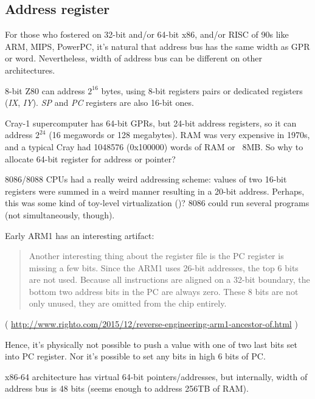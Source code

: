 \subsection{Address register}

For those who fostered on 32-bit and/or 64-bit x86, and/or RISC of 90s like ARM, MIPS, PowerPC, it's natural that
address bus has the same width as \ac{GPR} or \gls{word}.
Nevertheless, width of address bus can be different on other architectures.

8-bit Z80 can address $2^{16}$ bytes, using 8-bit registers pairs or dedicated registers (\emph{IX}, \emph{IY}).
\emph{SP} and \emph{PC} registers are also 16-bit ones.

Cray-1 supercomputer has 64-bit GPRs, but 24-bit address registers, so it can address $2^{24}$ 
(16 megawords or 128 megabytes).
RAM was very expensive in 1970s, and a typical Cray had 1048576 (0x100000) words of RAM or ~8MB.
So why to allocate 64-bit register for address or pointer?

8086/8088 CPUs had a really weird addressing scheme:
values of two 16-bit registers were summed in a weird manner resulting in a 20-bit address.
Perhaps, this was some kind of toy-level virtualization ()?
8086 could run several programs (not simultaneously, though).

Early ARM1 has an interesting artifact:

\begin{framed}
\begin{quotation}
Another interesting thing about the register file is the PC register is missing a few bits. Since the ARM1 uses 26-bit addresses, the top 6 bits are not used. Because all instructions are aligned on a 32-bit boundary, the bottom two address bits in the PC are always zero. These 8 bits are not only unused, they are omitted from the chip entirely.
\end{quotation}
\end{framed}

( \url{http://www.righto.com/2015/12/reverse-engineering-arm1-ancestor-of.html} )

Hence, it's physically not possible to push a value with one of two last bits set into PC register.
Nor it's possible to set any bits in high 6 bits of PC.

x86-64 architecture has virtual 64-bit pointers/addresses, but internally, width of address bus is 48 bits
(seems enough to address 256TB of \ac{RAM}).

